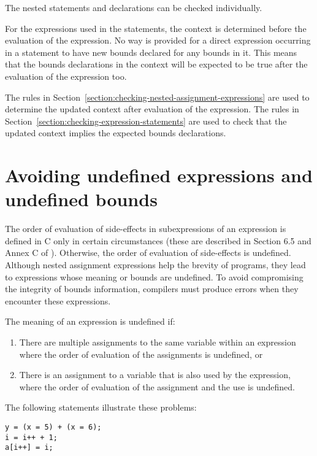 The nested statements and declarations can be checked individually.

For the expressions used in the statements, the context is determined
before the evaluation of the expression. No way is provided for a direct
expression occurring in a statement to have new bounds declared for any
bounds in it. This means that the bounds declarations in the context
will be expected to be true after the evaluation of the expression too.

The rules in Section~\ref{section:checking-nested-assignment-expressions}
are used to determine the updated context after evaluation of the
expression. The rules in Section~\ref{section:checking-expression-statements}
are used to check that the updated
context implies the expected bounds declarations.

\section{Avoiding undefined expressions and undefined bounds}
\label{section:avoiding-undefinedness}

The order of evaluation of side-effects in subexpressions of an
expression is defined in C only in certain circumstances (these are
described in Section 6.5 and Annex C of \cite{ISO2011}). Otherwise, the order of
evaluation of side-effects is undefined. Although nested assignment
expressions help the brevity of programs, they lead to expressions whose
meaning or bounds are undefined. To avoid compromising the integrity of
bounds information, compilers must produce errors when they encounter
these expressions.

The meaning of an expression is undefined if:

\begin{enumerate}
\item
  There are multiple assignments to the same variable within an
  expression where the order of evaluation of the assignments is
  undefined, or
\item
  There is an assignment to a variable that is also used by the
  expression, where the order of evaluation of the assignment and the
  use is undefined.
\end{enumerate}

The following statements illustrate these problems:

\begin{lstlisting}
y = (x = 5) + (x = 6);
i = i++ + 1;
a[i++] = i;
\end{lstlisting}

